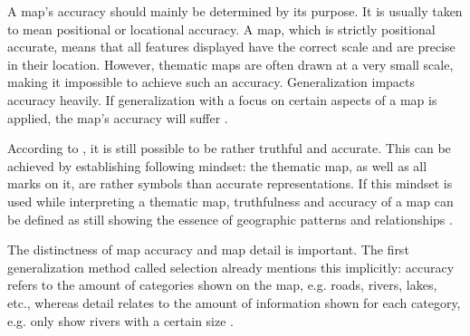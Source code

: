 A map's accuracy should mainly be determined by its purpose. It is usually taken to mean positional or locational accuracy. A map, which is strictly positional accurate, means that all features displayed have the correct scale and are precise in their location. However, thematic maps are often drawn at a very small scale, making it impossible to achieve such an accuracy. Generalization impacts accuracy heavily. If generalization with a focus on certain aspects of a map is applied, the map's accuracy will suffer .

According to \citeauthor{Tyner2010}, it is still possible to be rather truthful and accurate. This can be achieved by establishing following mindset: the thematic map, as well as all marks on it, are rather symbols than accurate representations. If this mindset is used while interpreting a thematic map, truthfulness and accuracy of a map can be defined as still showing the essence of geographic patterns and relationships .

The distinctness of map accuracy and map detail is important. The first generalization method called selection already mentions this implicitly: accuracy refers to the amount of categories shown on the map, e.g. roads, rivers, lakes, etc., whereas detail relates to the amount of information shown for each category, e.g. only show rivers with a certain size .
